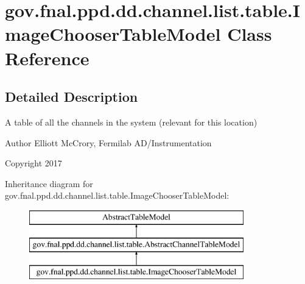 \hypertarget{classgov_1_1fnal_1_1ppd_1_1dd_1_1channel_1_1list_1_1table_1_1ImageChooserTableModel}{\section{gov.\-fnal.\-ppd.\-dd.\-channel.\-list.\-table.\-Image\-Chooser\-Table\-Model Class Reference}
\label{classgov_1_1fnal_1_1ppd_1_1dd_1_1channel_1_1list_1_1table_1_1ImageChooserTableModel}
}


\subsection{Detailed Description}
A table of all the channels in the system (relevant for this location)

\begin{DoxyAuthor}{Author}
Elliott Mc\-Crory, Fermilab A\-D/\-Instrumentation 
\end{DoxyAuthor}
\begin{DoxyCopyright}{Copyright}
2017 
\end{DoxyCopyright}
Inheritance diagram for gov.\-fnal.\-ppd.\-dd.\-channel.\-list.\-table.\-Image\-Chooser\-Table\-Model\-:\begin{figure}[H]
\begin{center}
\leavevmode
\includegraphics[height=3.000000cm]{classgov_1_1fnal_1_1ppd_1_1dd_1_1channel_1_1list_1_1table_1_1ImageChooserTableModel}
\end{center}
\end{figure}
